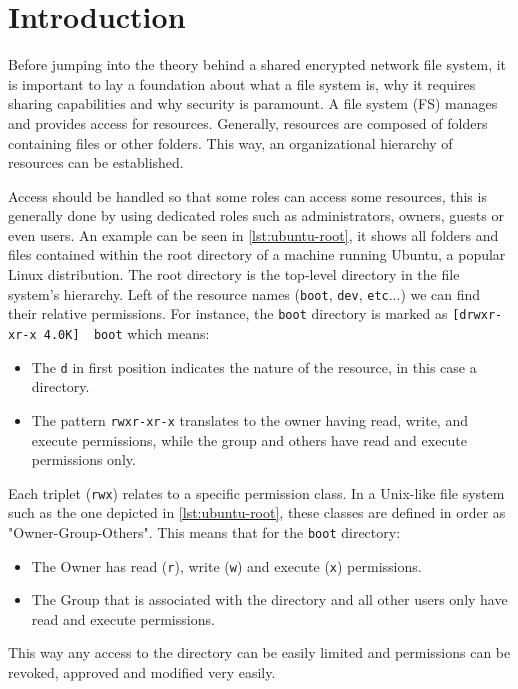 \section*{Introduction}
Before jumping into the theory behind a shared encrypted network file system, it is important to lay a foundation about what a file system is, why it requires sharing capabilities and why security is paramount. A file system (FS) manages and provides access for resources. Generally, resources are composed of folders containing files or other folders. This way, an organizational hierarchy of resources can be established.
    


Access should be handled so that some roles can access some resources, this is generally done by using dedicated roles such as administrators, owners, guests or even users. An example can be seen in \autoref{lst:ubuntu-root}, it shows all folders and files contained within the root directory of a machine running Ubuntu, a popular Linux distribution. The root directory is the top-level directory in the file system's hierarchy. Left of the resource names (\lstinline{boot}, \lstinline{dev}, \lstinline{etc}...) we can find their relative permissions. For instance, the \lstinline{boot} directory is marked as \lstinline{[drwxr-xr-x 4.0K]  boot} which means:
\begin{itemize}
    \item The \lstinline{d} in first position indicates the nature of the resource, in this case a directory.
    \item The pattern \lstinline{rwxr-xr-x} translates to the owner having read, write, and execute permissions, while the group and others have read and execute permissions only.
\end{itemize}

Each triplet (\lstinline{rwx}) relates to a specific permission class. In a Unix-like file system such as the one depicted in \autoref{lst:ubuntu-root}, these classes are defined in order as "Owner-Group-Others". This means that for the \lstinline{boot} directory:
\begin{itemize}
    \item The Owner has read (\lstinline{r}), write (\lstinline{w}) and execute (\lstinline{x}) permissions.
    \item The Group that is associated with the directory and all other users only have read and execute permissions.
\end{itemize}

This way any access to the directory can be easily limited and permissions can be revoked, approved and modified very easily.





